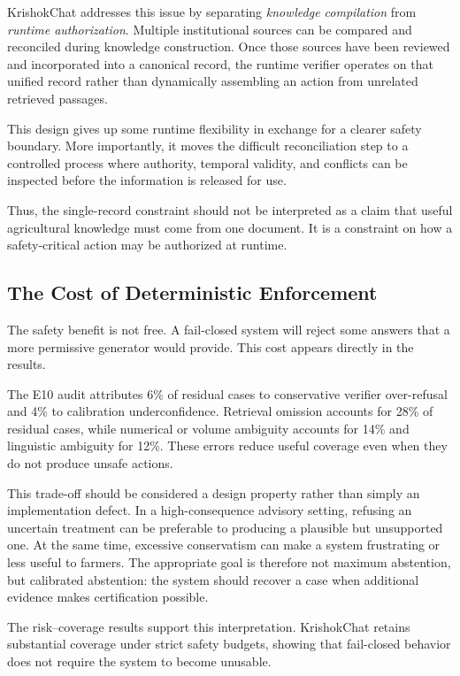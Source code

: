 \documentclass[a4paper,fleqn]{cas-dc}
\begin{document}
KrishokChat addresses this issue by separating \emph{knowledge compilation} from \emph{runtime authorization}. Multiple institutional sources can be compared and reconciled during knowledge construction. Once those sources have been reviewed and incorporated into a canonical record, the runtime verifier operates on that unified record rather than dynamically assembling an action from unrelated retrieved passages.

This design gives up some runtime flexibility in exchange for a clearer safety boundary. More importantly, it moves the difficult reconciliation step to a controlled process where authority, temporal validity, and conflicts can be inspected before the information is released for use.

Thus, the single-record constraint should not be interpreted as a claim that useful agricultural knowledge must come from one document. It is a constraint on how a safety-critical action may be authorized at runtime.

\subsection{The Cost of Deterministic Enforcement}

The safety benefit is not free. A fail-closed system will reject some answers that a more permissive generator would provide. This cost appears directly in the results.

The E10 audit attributes 6\% of residual cases to conservative verifier over-refusal and 4\% to calibration underconfidence. Retrieval omission accounts for 28\% of residual cases, while numerical or volume ambiguity accounts for 14\% and linguistic ambiguity for 12\%. These errors reduce useful coverage even when they do not produce unsafe actions. 

This trade-off should be considered a design property rather than simply an implementation defect. In a high-consequence advisory setting, refusing an uncertain treatment can be preferable to producing a plausible but unsupported one. At the same time, excessive conservatism can make a system frustrating or less useful to farmers. The appropriate goal is therefore not maximum abstention, but calibrated abstention: the system should recover a case when additional evidence makes certification possible.

The risk--coverage results support this interpretation. KrishokChat retains substantial coverage under strict safety budgets, showing that fail-closed behavior does not require the system to become unusable. 
\end{document}
